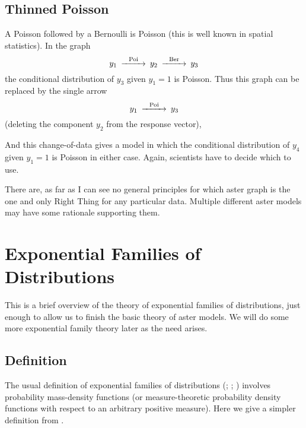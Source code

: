 \subsection{Thinned Poisson}

A Poisson followed by a Bernoulli is Poisson (this is well known in spatial
statistics).  In the graph
\begin{equation} \label{gr:poisson-bernoulli}
\begin{CD}
   y_1 @>\text{Poi}>> y_2 @>\text{Ber}>> y_3
\end{CD}
\end{equation}
the conditional distribution of $y_3$ given $y_1 = 1$ is Poisson.  Thus this
graph can be replaced by the single arrow
\begin{equation} \label{gr:poisson}
\begin{CD}
   y_1 @>\text{Poi}>> y_3
\end{CD}
\end{equation}
(deleting the component $y_2$ from the response vector),

And this change-of-data gives a model in which the conditional distribution
of $y_4$ given $y_1 = 1$ is Poisson in either case.
Again, scientists have to decide which to use.

There are, as far as I can see no general principles for which aster graph
is the one and only Right Thing for any particular data.  Multiple different
aster models may have some rationale supporting them.

\section{Exponential Families of Distributions}

This is a brief overview of the theory
of exponential families of distributions,
just enough to allow us to finish the basic theory of aster models.
We will do some more exponential family theory later as the need arises.

\subsection{Definition}
\label{sec:define-expfam}

The usual definition of exponential families of distributions
(\citealp[Chapter~8]{barndorff-nielsen}; \citealp[Chapter~1]{brown};
\citealp[Chapter~1]{geyer-thesis})
involves probability mass-density functions (or measure-theoretic probability
density functions with respect to an arbitrary positive measure).
Here we give a simpler definition from \citet{geyer-gdor}.

